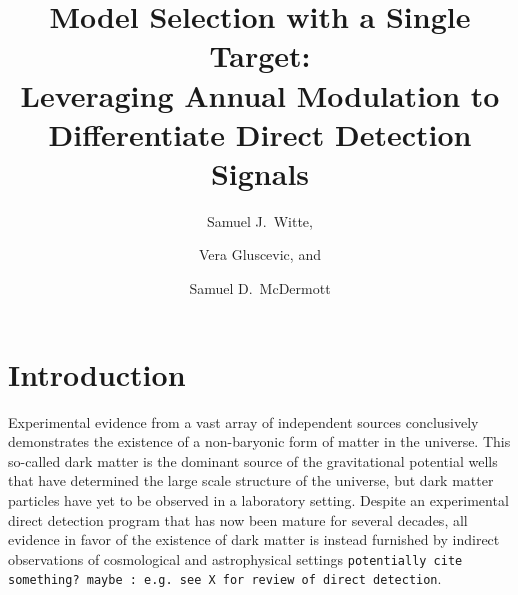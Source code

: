 \documentclass[11pt]{article}
\newcommand{\sjwColor}{red}
\newcommand{\sjwtt}[1]{{\color{\sjwColor}\tt #1}}
\begin{document}
\title{Model Selection with a Single Target:\\Leveraging Annual Modulation to Differentiate Direct Detection Signals}
\author[a,b]{Samuel J.~Witte,}
\author[c]{Vera Gluscevic, and}
\author[d]{Samuel D.~McDermott}






\abstract{


}

\maketitle

\section{Introduction} \setcounter{page}{2}

Experimental evidence from a vast array of independent sources conclusively demonstrates the existence of a non-baryonic form of matter in the universe. This so-called dark matter is the dominant source of the gravitational potential wells that have determined the large scale structure of the universe, but dark matter particles have yet to be observed in a laboratory setting. Despite an experimental direct detection program that has now been mature for several decades, all evidence in favor of the existence of dark matter is instead furnished by indirect observations of cosmological and astrophysical settings \sjwtt{potentially cite something? maybe : e.g. see X for review of direct detection}.
\end{document}
